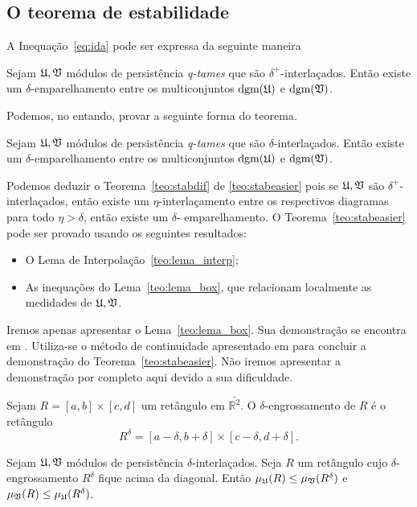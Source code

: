\subsection{O teorema de estabilidade}
A Inequação~\ref{eq:ida} pode ser expressa da seguinte maneira
\begin{teo}\label{teo:stabdif}
    Sejam $\mathfrak{U}, \mathfrak{V}$ módulos de persistência \textit{q-tames} que são 
    $\delta^+$-interlaçados. Então existe um $\delta$-emparelhamento entre os 
    multiconjuntos $\text{dgm}(\mathfrak{U})$ e $\text{dgm}(\mathfrak{V})$. 
\end{teo}

Podemos, no entando, provar a seguinte forma do teorema.
\begin{teo}\label{teo:stabeasier}
    Sejam $\mathfrak{U}, \mathfrak{V}$ módulos de persistência \textit{q-tames} que são 
    $\delta$-interlaçados. Então existe um $\delta$-emparelhamento entre os 
    multiconjuntos $\text{dgm}(\mathfrak{U})$ e $\text{dgm}(\mathfrak{V})$. 
\end{teo}

Podemos deduzir o Teorema~\ref{teo:stabdif} de \ref{teo:stabeasier} pois se 
$\mathfrak{U}, \mathfrak{V}$ são $\delta^+$-interlaçados, então existe um $\eta$-interlaçamento
entre os respectivos diagramas para todo $\eta > \delta$, então existe um $\delta$-
emparelhamento. O Teorema~\ref{teo:stabeasier} pode ser provado usando os seguintes
resultados:
\begin{itemize}
    \item O Lema de Interpolação~\ref{teo:lema_interp};
    \item As inequações do Lema~\ref{teo:lema_box}, que relacionam localmente
    as medidades de $\mathfrak{U}, \mathfrak{V}$. 
\end{itemize}
Iremos apenas apresentar o Lema~\ref{teo:lema_box}. Sua demonstração se 
encontra em \cite{Chazal2016}. Utiliza-se o método de continuidade apresentado
em \cite{CohenSteiner2006} para concluir a demonstração do Teorema~\ref{teo:stabeasier}.
Não iremos apresentar a demonstração por completo aqui devido a sua dificuldade. 

\begin{defi}
    Sejam $R = [a,b] \times [c,d]$ um retângulo em $\bar{\mathbb{R}^2}$. O 
    $\delta$-engrossamento de $R$ é o retângulo
    \begin{equation*}
        R^\delta = [a-\delta, b+\delta] \times [c-\delta, d + \delta].
    \end{equation*}
\end{defi}

\begin{lema}\label{teo:lema_box}
    Sejam $\mathfrak{U}, \mathfrak{V}$ módulos de persistência $\delta$-interlaçados. Seja 
    $R$ um retângulo cujo $\delta$-engrossamento $R^\delta$ fique acima da diagonal.
    Então $\mu_{\mathfrak{U}}(R) \leq \mu_{\mathfrak{V}}(R^\delta)$ e $\mu_{\mathfrak{V}}(R) \leq \mu_{\mathfrak{U}}(R^\delta)$.
\end{lema}
